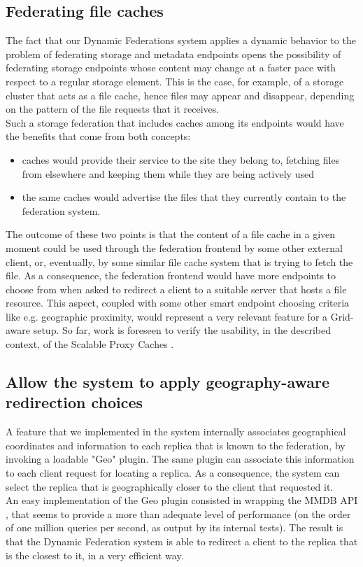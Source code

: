 \documentclass[12pt]{article} %
\begin{document}
\subsection{Federating file caches}

The fact that our Dynamic Federations system applies a dynamic behavior to the problem of federating storage and metadata endpoints opens the possibility of federating storage endpoints whose content may change at a faster pace with respect to a regular storage element.
This is the case, for example, of a storage cluster that acts as a file cache, hence files may appear and disappear, depending on the pattern of the file requests that it receives.\\
Such a storage federation that includes caches among its endpoints would have the benefits that come from both concepts:
\begin{itemize}
\item caches would provide their service to the site they belong to, fetching files from elsewhere and keeping them while they are being actively used
\item the same caches would advertise the files that they currently contain to the federation system.
\end{itemize}
The outcome of these two points is that the content of a file cache in a given moment could be used through the federation frontend by some other external client, or, eventually, by some similar file cache system that is trying to fetch the file. As a consequence, the federation frontend would have more endpoints to choose from when asked to redirect a client to a suitable server that hosts a file resource. This aspect, coupled with some other smart endpoint choosing criteria like e.g. geographic proximity, would represent a very relevant feature for a Grid-aware setup.
So far, work is foreseen to verify the usability, in the described context, of the Scalable Proxy Caches \cite{scalableproxycache}.


\subsection{Allow the system to apply geography-aware redirection choices}

A feature that we implemented in the system internally associates geographical coordinates and information to each replica that is known to the federation, by invoking a loadable "Geo" plugin. The same plugin can associate this information to each client request for locating a replica. As a consequence, the system can select the replica that is geographically closer to the client that requested it.\\
An easy implementation of the Geo plugin consisted in wrapping the MMDB API \cite{geoip}, that seems to provide a more than adequate level of performance (on the order of one million queries per second, as output by its internal tests). The result is that the Dynamic Federation system is able to redirect a client to the replica that is the closest to it, in a very efficient way.
\end{document}
